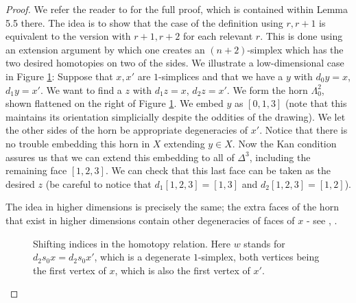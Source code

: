 \documentclass[12pt]{article}
\theoremstyle{plain}
\theoremstyle{definition}
\begin{document}
\begin{proof}
We refer the reader to \cite{MAY67} for the full proof, which is contained within Lemma 5.5 there. The idea is to show that the case of the definition using $r, r+1$ is equivalent to the version with $r+1, r+2$ for each relevant $r$. This is done using an extension argument by which one creates an $(n+2)$-simplex which has the two desired homotopies on two of the sides. We illustrate a low-dimensional case in Figure \ref{F: fig25}: Suppose that $x, x'$ are $1$-simplices and that we have a $y$ with $d_0y=x$, $d_1y=x'$. We want to find a $z$ with $d_1z=x$, $ d_2z=x'$. We form the horn $\Lambda^2_0$, shown flattened on the right of Figure \ref{F: fig25}. We embed $y$ as $[0,1,3]$ (note that this maintains its orientation simplicially despite the oddities of the drawing). We let the other sides of the horn be appropriate degeneracies of $x'$. Notice that there is no trouble embedding this horn in $X$  extending $y\in X$. Now the Kan condition assures us that we can extend this embedding to all of $\Delta^3$, including the remaining face $[1,2,3]$. We can check that this last face can be taken as the desired $z$ (be careful to notice that $d_1[1,2,3]=[1,3]$ and $d_2[1,2,3]=[1,2]$). 

The idea in higher dimensions is precisely the same; the extra  faces of the horn that exist in higher dimensions contain other degeneracies of faces of $x$ - see \cite[Lemma 5.5]{MAY67}, \cite[Proposition 1.19]{Cu71}.
\begin{figure}[!htp]
\begin{center}
\end{center}
\caption{Shifting indices in the homotopy relation. Here $w$ stands for  $d_2s_0x=d_2s_0x'$, which is a degenerate $1$-simplex, both vertices being the first vertex of $x$, which is also the first vertex of $x'$.}\label{F: fig25}
\end{figure}
\end{proof}
\end{document}
